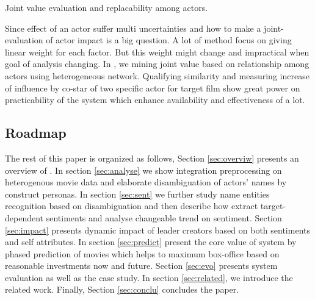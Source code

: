 \begin{difficulties} Joint value evaluation and replacability among actors.\end{difficulties}
\par Since effect of an actor suffer multi uncertainties and how to make a joint-evaluation of actor impact is a big question. A lot of method focus on giving linear weight for each factor. But this weight might change and impractical when goal of analysis changing. In \system, we mining joint value based on relationship among actors using heterogeneous network. Qualifying similarity and measuring increase of influence by co-star of two specific actor for target film show great power on practicability of the system which enhance availability and effectiveness of \system a lot.

\subsection{Roadmap}
The rest of this paper is organized as follows, Section \ref{sec:overviw} presents an overview of \system. In section \ref{sec:analyse} we show integration preprocessing on heterogenous movie data and elaborate disambiguation of actors' names by construct personas. In section \ref{sec:sent} we further study name entities recognition based on disambiguation and then describe how \system extract target-dependent sentiments and analyse changeable trend on sentiment. Section \ref{sec:impact} presents dynamic impact of leader creators based on both sentiments and self attributes. In section \ref{sec:predict} present the core value of system by phased prediction of movies which helps to maximum box-office based on reasonable investments now and future. Section \ref{sec:evo} presents system evaluation as well as the case study. In section \ref{sec:related}, we introduce the related work. Finally, Section \ref{sec:conclu} concludes the paper. 
